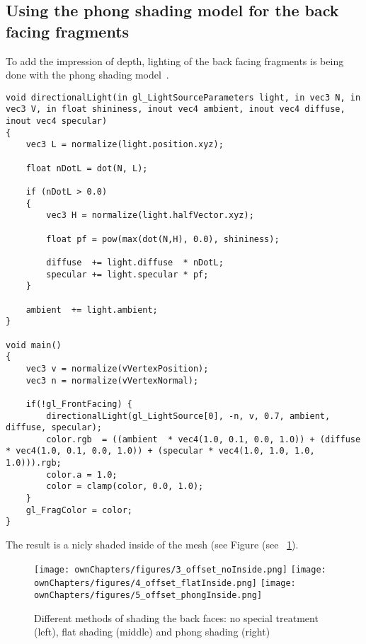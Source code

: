 \subsection{Using the phong shading model for the back facing fragments}
To add the impression of depth, lighting of the back facing fragments is being done with the phong shading model~\cite{book:computerGraphicsHearn}.
\begin{lstlisting}
void directionalLight(in gl_LightSourceParameters light, in vec3 N, in vec3 V, in float shininess, inout vec4 ambient, inout vec4 diffuse, inout vec4 specular)
{
	vec3 L = normalize(light.position.xyz);
	 
	float nDotL = dot(N, L);
	 
	if (nDotL > 0.0)
	{   
		vec3 H = normalize(light.halfVector.xyz);
			 
		float pf = pow(max(dot(N,H), 0.0), shininess);

		diffuse  += light.diffuse  * nDotL;
		specular += light.specular * pf;
	}
	 
	ambient  += light.ambient;
}

void main()
{
	vec3 v = normalize(vVertexPosition);
	vec3 n = normalize(vVertexNormal);
	
	if(!gl_FrontFacing) {
		directionalLight(gl_LightSource[0], -n, v, 0.7, ambient, diffuse, specular);
		color.rgb  = ((ambient  * vec4(1.0, 0.1, 0.0, 1.0)) + (diffuse  * vec4(1.0, 0.1, 0.0, 1.0)) + (specular * vec4(1.0, 1.0, 1.0, 1.0))).rgb;			
		color.a = 1.0;			
		color = clamp(color, 0.0, 1.0);
	}
	gl_FragColor = color;
}
\end{lstlisting}

The result is a nicly shaded inside of the mesh (see Figure (see ~\ref{fig:shading}).

\begin{figure}%
\centering
\texttt{[image: ownChapters/figures/3\_offset\_noInside.png]}%
\hspace{7.00mm}
\texttt{[image: ownChapters/figures/4\_offset\_flatInside.png]}%
\hspace{7.00mm}
\texttt{[image: ownChapters/figures/5\_offset\_phongInside.png]}%
\caption{Different methods of shading the back faces: no special treatment (left), flat shading (middle) and phong shading (right)}%
\label{fig:shading}%
\end{figure}
